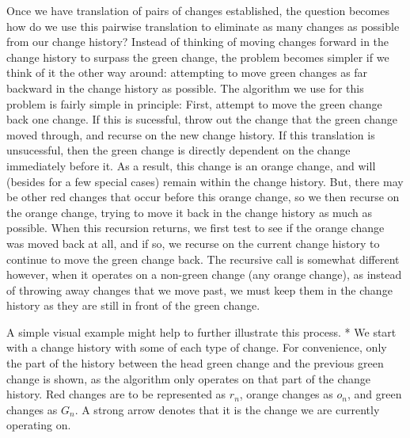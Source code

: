 \documentclass{article}
\begin{document}
Once we have translation of pairs of changes established, 
the question becomes how do we use this pairwise translation 
to eliminate as many changes 
as possible from our change history? 
Instead of thinking of moving changes 
forward in the change history 
to surpass the green change, 
the problem becomes simpler 
if we think of it the other way around: 
attempting to move green changes 
as far backward 
in the change history as possible. 
The algorithm we use for this problem 
is fairly simple in principle: 
First, attempt to move the green change back one change. 
If this is sucessful, 
throw out the change that the green change moved through, 
and recurse on the new change history. 
If this translation is unsucessful, 
then the green change is directly dependent 
on the change immediately before it. 
As a result, 
this change is an orange change, 
and will (besides for a few special cases) 
remain within the change history. 
But, there may be other 
red changes that occur before this orange change, 
so we then recurse on the orange change, 
trying to move it back in the change history 
as much as possible. 
When this recursion returns, 
we first test to see if the orange change 
was moved back at all, 
and if so, 
we recurse on the current change history 
to continue to move the green change back. 
The recursive call is somewhat different however, 
when it operates on a non-green change (any orange change), 
as instead of throwing away changes 
that we move past, 
we must keep them in the change history 
as they are still in front of the green change.

A simple visual example 
might help to further illustrate this process.
* We start with a change history 
with some of each type of change. 
For convenience, 
only the part of the history 
between the head green change 
and the previous green change 
is shown, 
as the algorithm only operates 
on that part of the 
change history. 
Red changes are to be represented as $r_n$, 
orange changes as $o_n$, 
and green changes as $G_n$. 
A strong arrow denotes 
that it is the change we are currently operating on.
\end{document}
